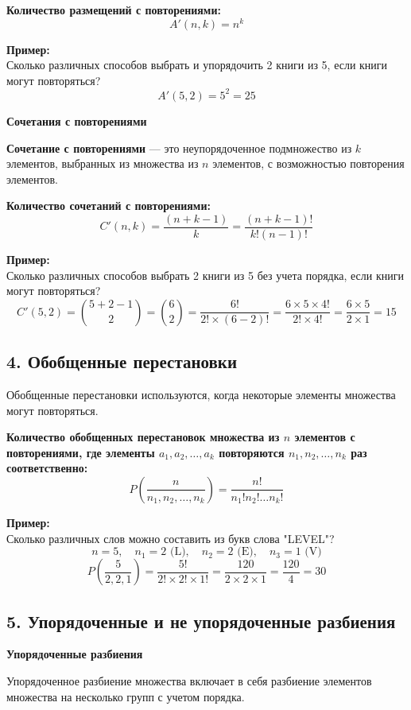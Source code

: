 \documentclass{article}
\begin{document}
\textbf{Количество размещений с повторениями:}
\[
A'(n, k) = n^k
\]

\textbf{Пример:} \\
Сколько различных способов выбрать и упорядочить 2 книги из 5, если книги могут повторяться?
\[
A'(5, 2) = 5^2 = 25
\]

\textbf{Сочетания с повторениями}

\textbf{Сочетание с повторениями} — это неупорядоченное подмножество из \( k \) элементов, выбранных из множества из \( n \) элементов, с возможностью повторения элементов.

\textbf{Количество сочетаний с повторениями:}
\[
C'(n, k) = \frac{(n+k-1)}{k} = \frac{(n+k-1)!}{k! (n-1)!}
\]

\textbf{Пример:} \\
Сколько различных способов выбрать 2 книги из 5 без учета порядка, если книги могут повторяться?
\[
C'(5, 2) = \binom{5+2-1}{2} = \binom{6}{2} = \frac{6!}{2! \times (6 - 2)!} = \frac{6 \times 5 \times 4!}{2! \times 4!} = \frac{6 \times 5}{2 \times 1} = 15
\]
\pagebreak

\subsection*{4. Обобщенные перестановки}


Обобщенные перестановки используются, когда некоторые элементы множества могут повторяться. 

\textbf{Количество обобщенных перестановок множества из \( n \) элементов с повторениями, где элементы \( a_1, a_2, \ldots, a_k \) повторяются \( n_1, n_2, \ldots, n_k \) раз соответственно:}
\[
P\left( \frac{n}{n_1, n_2, \ldots, n_k} \right) = \frac{n!}{n_1! n_2! \ldots n_k!}
\]

\textbf{Пример:} \\
Сколько различных слов можно составить из букв слова "LEVEL"?
\[
n = 5, \quad n_1 = 2 \text{ (L)}, \quad n_2 = 2 \text{ (E)}, \quad n_3 = 1 \text{ (V)}
\]
\[
P\left( \frac{5}{2, 2, 1} \right) = \frac{5!}{2! \times 2! \times 1!} = \frac{120}{2 \times 2 \times 1} = \frac{120}{4} = 30
\]
\pagebreak


\subsection*{5. Упорядоченные и не упорядоченные разбиения}
\textbf{Упорядоченные разбиения}

Упорядоченное разбиение множества включает в себя разбиение элементов множества на несколько групп с учетом порядка.
\end{document}
